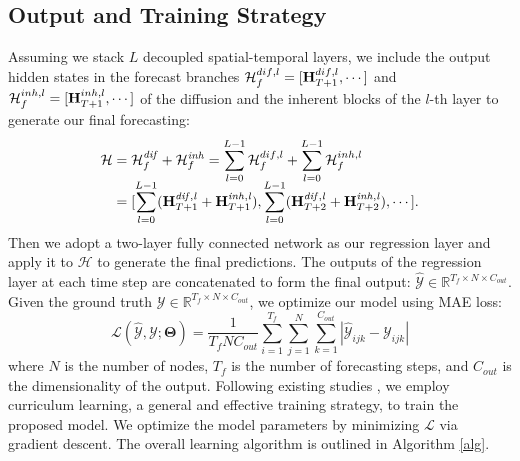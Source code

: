 \documentclass[sigconf, nonacm]{acmart}
\def\bb#1{\mathbb{#1}}
\def\b#1{\mathbf{#1}}
\def\cal#1{\mathcal{#1}}
\begin{document}
 \subsection{Output and Training Strategy}
{\color{black}Assuming we stack $L$ decoupled spatial-temporal layers, we include the output hidden states in the forecast branches $\mathcal{H}_f^{{\color{black}dif}, l}=[\mathbf{H}_{T+1}^{{\color{black}dif}, l}, \cdots]$ and $\mathcal{H}_f^{{\color{black}inh}, l}=[\mathbf{H}_{T+1}^{{\color{black}inh}, l}, \cdots]$ of {\color{black}the diffusion and the inherent} blocks of the $l$-th layer to generate our final forecasting}:
\begin{equation}
\begin{split}
      \cal{H} &= \cal{H}_f^{\mathit{{\color{black}dif}}} + \cal{H}_f^{\mathit{{\color{black}inh}}}=
    \sum_{l=0}^{L-1}\mathcal{H}_f^{{\color{black}dif}, l} + \sum_{l=0}^{L-1}\mathcal{H}_f^{{\color{black}inh}, l}\\[-2mm]
      & = [\sum_{l=0}^{L-1}(\b{H}^{\mathit{{\color{black}dif}, l}}_{T+1}+\b{H}^{\mathit{{\color{black}inh}, l}}_{T+1}), \sum_{l=0}^{L-1}(\b{H}^{\mathit{{\color{black}dif}, l}}_{T+2}+\b{H}^{\mathit{{\color{black}inh}, l}}_{T+2}), \cdots].\\
    \end{split}
\end{equation}
{\color{black}Then we adopt a two-layer fully connected network as our regression layer and apply it to $\cal{H}$ to generate the final predictions.
The outputs of the regression layer at each time step are concatenated to form the final output:}
$\hat{\mathcal{Y}}\in\bb{R}^{T_f\times N \times C_{\mathit{out}}}$. 
Given the ground truth \noindent$\cal{Y}\in\bb{R}^{T_f\times N \times C_{\mathit{out}}}$, {\color{black} we optimize our model using MAE loss}:
\vspace{-0.2cm}
\begin{equation}
\cal{L}(\hat{\cal{Y}}, \cal{Y};\b{\Theta})=\frac{1}{T_fNC_{\mathit{out}}}
    \sum_{i=1}^{T_f}\sum_{j=1}^{N}\sum_{k=1}^{C_{\mathit{out}}}|\hat{\cal{Y}}_{ijk} - \cal{Y}_{ijk}|
    \label{loss}
\end{equation}
where $N$ is the number of nodes, $T_f$ is the number of forecasting steps, and $C_{\mathit{out}}$ is the dimensionality of the output.
Following existing studies \cite{2021DGCRN, 2020MTGNN}, we employ curriculum learning, a general and effective training strategy, to train the proposed model. 
We optimize the model parameters by minimizing $\cal{L}$ via gradient descent. 
The overall learning algorithm is outlined in Algorithm \ref{alg}.
\end{document}
